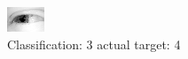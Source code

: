 \begin{figure}[h!]
\begin{center}
\includegraphics[width=0.60\columnwidth]{figures/ID2550_class_3_target_4.png}
\end{center}
\caption{ Classification: 3 actual target: 4}
\label{fig:ID2550_class_3_target_4}
\end{figure}
